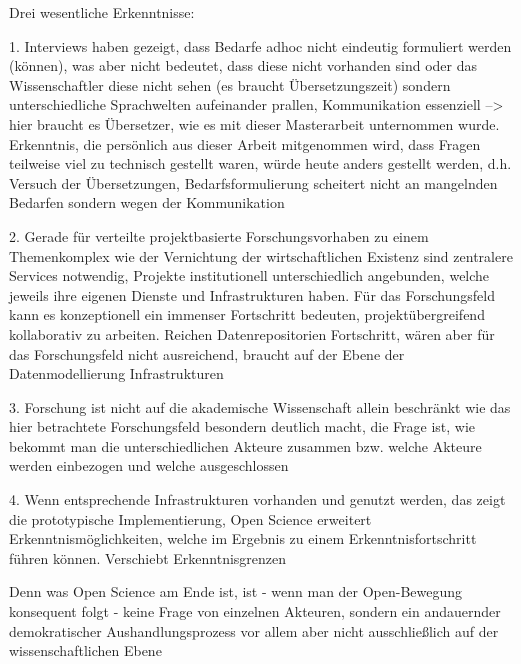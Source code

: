 \onehalfspacing



Drei wesentliche Erkenntnisse:

1. Interviews haben gezeigt, dass Bedarfe adhoc nicht eindeutig formuliert werden (können), was aber nicht bedeutet, dass diese nicht vorhanden sind oder das Wissenschaftler diese nicht sehen (es braucht Übersetzungszeit) sondern unterschiedliche Sprachwelten aufeinander prallen, Kommunikation essenziell --> hier braucht es Übersetzer, wie es mit dieser Masterarbeit unternommen wurde. Erkenntnis, die persönlich aus dieser Arbeit mitgenommen wird, dass Fragen teilweise viel zu technisch gestellt waren, würde heute anders gestellt werden, d.h. Versuch der Übersetzungen, Bedarfsformulierung scheitert nicht an mangelnden Bedarfen sondern wegen der Kommunikation

2. Gerade für verteilte projektbasierte Forschungsvorhaben zu einem Themenkomplex wie der Vernichtung der wirtschaftlichen Existenz sind zentralere Services notwendig, Projekte institutionell unterschiedlich angebunden, welche jeweils ihre eigenen Dienste und Infrastrukturen haben. Für das Forschungsfeld kann es konzeptionell ein immenser Fortschritt bedeuten, projektübergreifend kollaborativ zu arbeiten. Reichen Datenrepositorien Fortschritt, wären aber für das Forschungsfeld nicht ausreichend, braucht auf der Ebene der Datenmodellierung Infrastrukturen

3. Forschung ist nicht auf die akademische Wissenschaft allein beschränkt wie das hier betrachtete Forschungsfeld besondern deutlich macht, die Frage ist, wie bekommt man die unterschiedlichen Akteure zusammen bzw. welche Akteure werden einbezogen und welche ausgeschlossen

4. Wenn entsprechende Infrastrukturen vorhanden und genutzt werden, das zeigt die prototypische Implementierung, Open Science erweitert Erkenntnismöglichkeiten, welche im Ergebnis zu einem Erkenntnisfortschritt führen können. Verschiebt Erkenntnisgrenzen


Denn was Open Science am Ende ist, ist - wenn man der Open-Bewegung konsequent folgt - keine Frage von einzelnen Akteuren, sondern ein andauernder demokratischer Aushandlungsprozess vor allem aber nicht ausschließlich auf der wissenschaftlichen Ebene